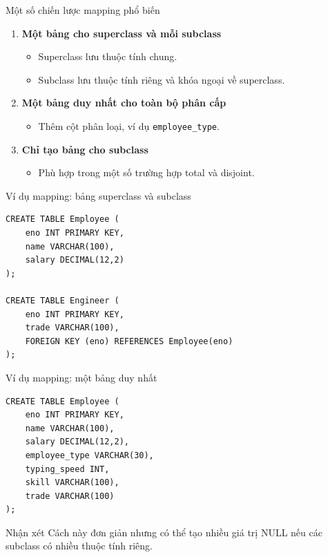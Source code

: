 \documentclass[aspectratio=169,11pt]{beamer}
\newcommand{\codeword}[1]{\texttt{#1}}
\begin{document}
\begin{frame}{Một số chiến lược mapping phổ biến}
\begin{enumerate}
    \item \textbf{Một bảng cho superclass và mỗi subclass}
    \begin{itemize}
        \item Superclass lưu thuộc tính chung.
        \item Subclass lưu thuộc tính riêng và khóa ngoại về superclass.
    \end{itemize}
    \item \textbf{Một bảng duy nhất cho toàn bộ phân cấp}
    \begin{itemize}
        \item Thêm cột phân loại, ví dụ \codeword{employee\_type}.
    \end{itemize}
    \item \textbf{Chỉ tạo bảng cho subclass}
    \begin{itemize}
        \item Phù hợp trong một số trường hợp total và disjoint.
    \end{itemize}
\end{enumerate}
\end{frame}

\begin{frame}[fragile]{Ví dụ mapping: bảng superclass và subclass}
\begin{lstlisting}
CREATE TABLE Employee (
    eno INT PRIMARY KEY,
    name VARCHAR(100),
    salary DECIMAL(12,2)
);

CREATE TABLE Engineer (
    eno INT PRIMARY KEY,
    trade VARCHAR(100),
    FOREIGN KEY (eno) REFERENCES Employee(eno)
);
\end{lstlisting}
\end{frame}

\begin{frame}[fragile]{Ví dụ mapping: một bảng duy nhất}
\begin{lstlisting}
CREATE TABLE Employee (
    eno INT PRIMARY KEY,
    name VARCHAR(100),
    salary DECIMAL(12,2),
    employee_type VARCHAR(30),
    typing_speed INT,
    skill VARCHAR(100),
    trade VARCHAR(100)
);
\end{lstlisting}

\begin{alertblock}{Nhận xét}
Cách này đơn giản nhưng có thể tạo nhiều giá trị NULL nếu các subclass có nhiều thuộc tính riêng.
\end{alertblock}
\end{frame}
\end{document}
